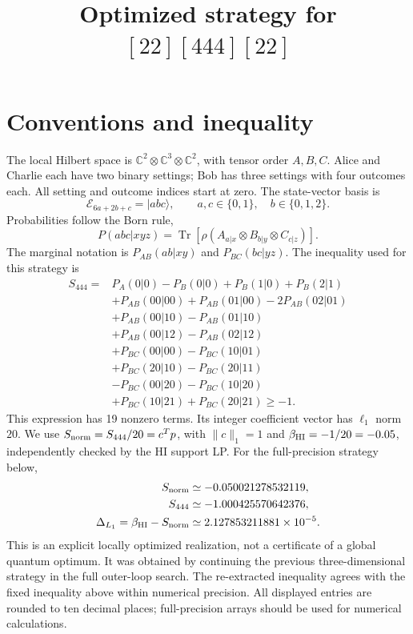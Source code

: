 \documentclass[11pt]{article}
\title{Optimized strategy for $[22][444][22]$}
\author{}
\date{}
\begin{document}
\maketitle
\section{Conventions and inequality}
\label{app:444_strategy}
The local Hilbert space is $\mathbb C^2\otimes\mathbb C^3\otimes\mathbb C^2$,
with tensor order $A,B,C$. Alice and Charlie each have two binary settings;
Bob has three settings with four outcomes each. All setting and outcome
indices start at zero. The state-vector basis is
\[
\mathcal E_{6a+2b+c}=|abc\rangle,\qquad
 a,c\in\{0,1\},\quad b\in\{0,1,2\}.
\]
Probabilities follow the Born rule,
\[
P(abc|xyz)=\operatorname{Tr}\!\left[\rho
 (A_{a|x}\otimes B_{b|y}\otimes C_{c|z})\right].
\]
The marginal notation is $P_{AB}(ab|xy)$ and $P_{BC}(bc|yz)$.
The inequality used for this strategy is
\begin{equation}
\begin{aligned}
S_{444}={}&P_A(0|0)-P_B(0|0)+P_B(1|0)+P_B(2|1)\\
&+P_{AB}(00|00)+P_{AB}(01|00)-2P_{AB}(02|01)\\
&+P_{AB}(00|10)-P_{AB}(01|10)\\
&+P_{AB}(00|12)-P_{AB}(02|12)\\
&+P_{BC}(00|00)-P_{BC}(10|01)\\
&+P_{BC}(20|10)-P_{BC}(20|11)\\
&-P_{BC}(00|20)-P_{BC}(10|20)\\
&+P_{BC}(10|21)+P_{BC}(20|21)\geq -1.
\end{aligned}
\end{equation}
This expression has 19 nonzero terms. Its integer coefficient vector has $\ell_1$ norm $20$. We use
$S_{\rm norm}=S_{444}/20=c^Tp$, with $\|c\|_1=1$ and
$\beta_{\rm HI}=-1/20=-0.05$, independently checked by the HI support LP.
For the full-precision strategy below,
\[
\begin{aligned}
S_{\rm norm}&\simeq -0.050021278532119,\\
S_{444}&\simeq -1.000425570642376,\\
\Delta_{L_1}=\beta_{\rm HI}-S_{\rm norm}&\simeq 2.127853211881\times10^{-5}.
\end{aligned}
\]
This is an explicit locally optimized realization, not a certificate of a
global quantum optimum. It was obtained by continuing the previous
three-dimensional strategy in the full outer-loop search. The re-extracted
inequality agrees with the fixed inequality above within numerical precision.
All displayed entries are rounded to ten decimal places; full-precision
arrays should be used for numerical calculations.
\end{document}
